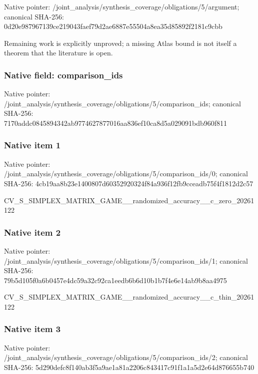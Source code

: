 \documentclass[10pt,a4paper]{article}
\begin{document}
Native pointer: /joint\_analysis/synthesi\allowbreak{}s\_coverage/obligations/5\allowbreak{}/argument; canonical SHA-256: 0d20e987967139ce219043fa\allowbreak{}ef79d2ae6887e55504a8ea35\allowbreak{}d85892f2181c9cbb


Remaining work is explicitly unproved; a missing Atlas bound is not itself a theorem that the literature is open.


\subsubsection{Native field: comparison\_ids}


Native pointer: /joint\_analysis/synthesi\allowbreak{}s\_coverage/obligations/5\allowbreak{}/comparison\_ids; canonical SHA-256: 7170addc0845894342ab9774\allowbreak{}627877016aa836ef10ca8d5a\allowbreak{}029091bdb960f811



\subsubsection{Native item 1}


Native pointer: /joint\_analysis/synthesi\allowbreak{}s\_coverage/obligations/5\allowbreak{}/comparison\_ids/0; canonical SHA-256: 4cb19aa8b23e1400807d6035\allowbreak{}2920324f84a936f12fb9ccea\allowbreak{}db75f4f1812d2c57


CV\_S\_SIMPLEX\_MATRIX\_GAME\allowbreak{}\_\_randomized\_accuracy\_\_c\allowbreak{}\_zero\_20261122


\subsubsection{Native item 2}


Native pointer: /joint\_analysis/synthesi\allowbreak{}s\_coverage/obligations/5\allowbreak{}/comparison\_ids/1; canonical SHA-256: 79b5d105f0a6b0457e4dc59a\allowbreak{}32c92ca1eedb6b6d10b1b7f4\allowbreak{}e6e14ab9b8aa4975


CV\_S\_SIMPLEX\_MATRIX\_GAME\allowbreak{}\_\_randomized\_accuracy\_\_c\allowbreak{}\_thin\_20261122


\subsubsection{Native item 3}


Native pointer: /joint\_analysis/synthesi\allowbreak{}s\_coverage/obligations/5\allowbreak{}/comparison\_ids/2; canonical SHA-256: 5d290defc8f140ab3f5a9ae1\allowbreak{}a81a2206c843417c91f1a1a5\allowbreak{}d2e64d876655b740
\end{document}
